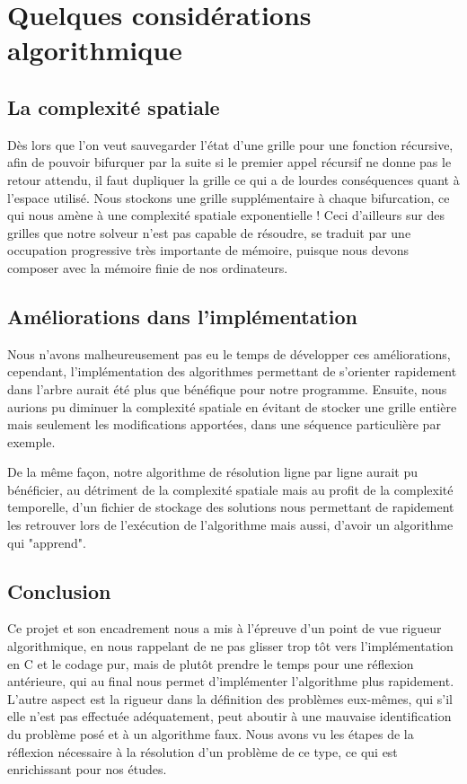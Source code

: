 \documentclass{report}
\begin{document}
\section{Quelques considérations algorithmique}
\subsection{La complexité spatiale}
Dès lors que l'on veut sauvegarder l'état d'une grille pour une fonction récursive, afin de pouvoir bifurquer par la suite si le premier appel récursif ne donne pas le retour attendu, il faut dupliquer la grille ce qui a de lourdes conséquences quant à l'espace utilisé. Nous stockons une grille supplémentaire à chaque bifurcation, ce qui nous amène à une complexité spatiale exponentielle ! Ceci d'ailleurs sur des grilles que notre solveur n'est pas capable de résoudre, se traduit par une occupation progressive très importante de mémoire, puisque nous devons composer avec la mémoire finie de nos ordinateurs.

\subsection{Améliorations dans l'implémentation}
Nous n'avons malheureusement pas eu le temps de développer ces améliorations, cependant, l'implémentation des algorithmes permettant de s'orienter rapidement dans l'arbre aurait été plus que bénéfique pour notre programme. Ensuite, nous aurions pu diminuer la complexité spatiale en évitant de stocker une grille entière mais seulement les modifications apportées, dans une séquence particulière par exemple.

De la même façon, notre algorithme de résolution ligne par ligne aurait pu bénéficier, au détriment de la complexité spatiale mais au profit de la complexité temporelle, d'un fichier de stockage des solutions nous permettant de rapidement les retrouver lors de l'exécution de l'algorithme mais aussi, d'avoir un algorithme qui "apprend".

\subsection*{Conclusion}
Ce projet et son encadrement nous a mis à l'épreuve d'un point de vue rigueur algorithmique, en nous rappelant de ne pas glisser trop tôt vers l'implémentation en C et le codage pur, mais de plutôt prendre le temps pour une réflexion antérieure, qui au final nous permet d'implémenter l'algorithme plus rapidement. L'autre aspect est la rigueur dans la définition des problèmes eux-mêmes, qui s'il elle n'est pas effectuée adéquatement, peut aboutir à une mauvaise identification du problème posé et à un algorithme faux. Nous avons vu les étapes de la réflexion nécessaire à la résolution d'un problème de ce type, ce qui est enrichissant pour nos études.
\end{document}
